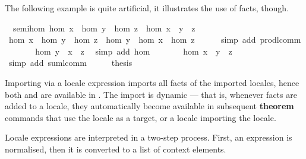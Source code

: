\begin{isabellebody}
\begin{isamarkuptext}
  The following example is quite artificial, it illustrates the use of
  facts, though.%
\end{isamarkuptext}%
\isamarkuptrue%
\isamarkupfalse%
\ {\isacharparenleft}\ semi{\isacharunderscore}hom{\isacharparenright}\ {\isachardoublequoteopen}hom\ x\ {\isasymcdot}\ {\isacharparenleft}hom\ y\ {\isasymcdot}\ hom\ z{\isacharparenright}\ {\isacharequal}\ hom\ {\isacharparenleft}x\ {\isasymoplus}\ {\isacharparenleft}y\ {\isasymoplus}\ z{\isacharparenright}{\isacharparenright}{\isachardoublequoteclose}\isanewline
%
\isadelimproof
%
\endisadelimproof
%
\isatagproof
{}\isamarkupfalse%
\ {\isacharminus}\isanewline
\ \ \isamarkupfalse%
\ {\isachardoublequoteopen}hom\ x\ {\isasymcdot}\ {\isacharparenleft}hom\ y\ {\isasymcdot}\ hom\ z{\isacharparenright}\ {\isacharequal}\ hom\ y\ {\isasymcdot}\ {\isacharparenleft}hom\ x\ {\isasymcdot}\ hom\ z{\isacharparenright}{\isachardoublequoteclose}\isanewline
\ \ \ \ \isamarkupfalse%
\ {\isacharparenleft}simp\ add{\isacharcolon}\ prod{\isachardot}lcomm{\isacharparenright}\isanewline
\ \ \isamarkupfalse%
\ \isamarkupfalse%
\ {\isachardoublequoteopen}{\isasymdots}\ {\isacharequal}\ hom\ {\isacharparenleft}y\ {\isasymoplus}\ {\isacharparenleft}x\ {\isasymoplus}\ z{\isacharparenright}{\isacharparenright}{\isachardoublequoteclose}\ \isamarkupfalse%
\ {\isacharparenleft}simp\ add{\isacharcolon}\ hom{\isacharparenright}\isanewline
\ \ \isamarkupfalse%
\ \isamarkupfalse%
\ {\isachardoublequoteopen}{\isasymdots}\ {\isacharequal}\ hom\ {\isacharparenleft}x\ {\isasymoplus}\ {\isacharparenleft}y\ {\isasymoplus}\ z{\isacharparenright}{\isacharparenright}{\isachardoublequoteclose}\ \isamarkupfalse%
\ {\isacharparenleft}simp\ add{\isacharcolon}\ sum{\isachardot}lcomm{\isacharparenright}\isanewline
\ \ \isamarkupfalse%
\ \isamarkupfalse%
\ {\isacharquery}thesis\ \isacommand{{\isachardot}}\isamarkupfalse%
\isanewline
{}\isamarkupfalse%
%
\endisatagproof
{\isafoldproof}%
%
\isadelimproof
%
\endisadelimproof
%
\begin{isamarkuptext}%
Importing via a locale expression imports all facts of
  the imported locales, hence both  and  are
  available in .  The import is dynamic --- that is,
  whenever facts are added to a locale, they automatically
  become available in subsequent \textbf{theorem} commands that use
  the locale as a target, or a locale importing the locale.%
\end{isamarkuptext}%
\isamarkuptrue%
%
\isamarkuptrue%
%
\label{sec-normal-forms}
\newcommand{\I}{\mathcal{I}}
\newcommand{\F}{\mathcal{F}}
\newcommand{\N}{\mathcal{N}}
\newcommand{\C}{\mathcal{C}}
\newcommand{\App}{\mathbin{\overline{@}}}
%
\begin{isamarkuptext}%
Locale expressions are interpreted in a two-step process.  First, an
  expression is normalised, then it is converted to a list of context
  elements.


\end{isamarkuptext}
\end{isabellebody}
